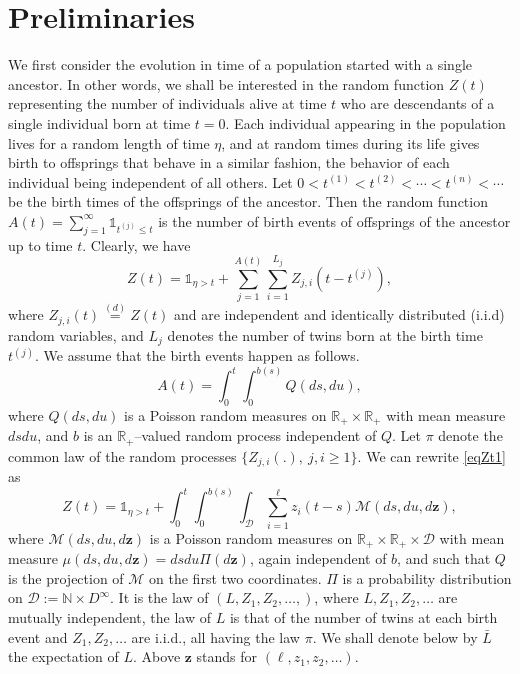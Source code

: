 \documentclass[11pt]{article}
\def\N{{\mathbb N}}
\def\R{{\mathbb R}}
\def\D {\mathcal{D}}
\def\L {\bar{L}}
\def\z {\mathbf{z}}
\begin{document}
\section{Preliminaries}
We first consider the evolution in time of a population started with a single ancestor. In other words, we shall be interested in the random function $Z(t)$ 
representing the number of individuals alive at time $t$ who are descendants of a single individual born at time $t=0$. Each individual appearing in the population lives for a random length of time $\eta$, and at random times during its life gives birth to offsprings that behave in a similar fashion, the behavior of each individual being independent of all others. Let $0< t^{(1)}< t^{(2)}< \cdots < t^{(n)}< \cdots$ be the birth times of the offsprings of the ancestor. Then the random function 
$A(t)= \sum_{j=1}^{\infty} \mathds{1}_{t^{(j)}\le t} $
is the number of birth events of offsprings of the ancestor up to time $t$. Clearly, we have 
\begin{equation}\label{eqZt1}  
Z(t)= \mathds{1}_{\eta >t} + \sum_{j=1}^{A(t)} \sum_{i=1}^{L_j}Z_{j,i}(t-t^{(j)}),
\end{equation} 
where $Z_{j,i}(t)  \stackrel{(d)}{=}  Z(t)$ and are independent and identically distributed (i.i.d) random variables, and $L_j$ denotes the number of twins born at the birth time  $t^{(j)}$. We assume that the birth events happen as follows.
\begin{equation*}
A(t)= \int_0^t \int_0^{b(s)} Q(ds,du),
\end{equation*}
where $Q(ds,du)$ is a Poisson random measures on $\R_+ \times \R_+$ with mean measure $dsdu$, and $b$ is an $\R_+$--valued random process independent of $Q$.  Let $\pi$ denote the common law of the random processes $\{Z_{j,i}(.), \ j, i \ge 1\}$. We can rewrite \eqref{eqZt1} as
\begin{equation}\label{eqZt2}   
Z(t)= \mathds{1}_{\eta >t} +  \int_0^t \int_0^{b(s)}\int_{\D} \sum_{i=1}^\ell z_i(t-s) \mathcal{M}(ds,du,d\z),
\end{equation} 
where $\mathcal{M}(ds,du,d\z)$ is a Poisson random measures on $\R_+ \times \R_+ \times \D$ with mean measure $\mu(ds,du,d\z)=dsdu\Pi(d\z)$, again independent of $b$, and such that $Q$ is the projection of $\mathcal{M}$ on the first two coordinates.
$\Pi$ is a probability distribution on $\D:=\N\times D^\infty$. It is the law of $(L, Z_1,Z_2,\ldots,)$, where $L, Z_1,Z_2, \ldots$ are mutually independent, the law of $L$ is that
of the number of twins at each birth event and $Z_1,Z_2, \ldots$ are i.i.d., all having the law $\pi$. We shall denote below by $\L$ the expectation of $L$.
Above $\z$ stands for $(\ell,z_1,z_2,\ldots)$.
\end{document}
